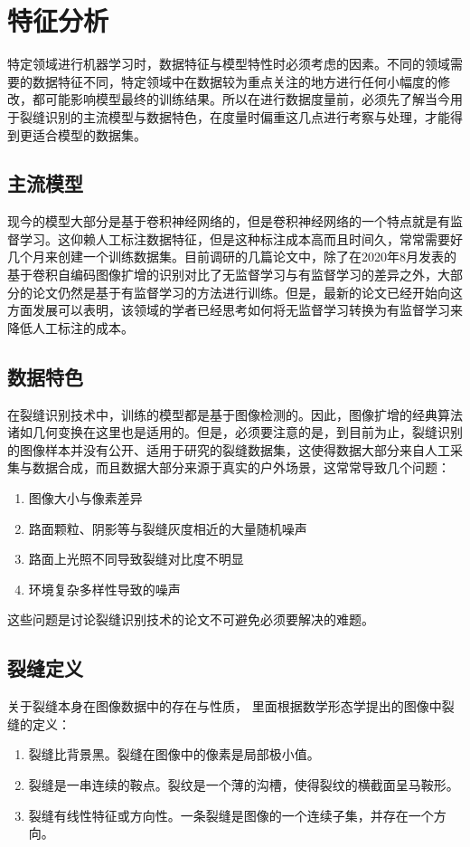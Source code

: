 \documentclass[a4paper,UTF8]{article}
\theoremstyle{definition}
\begin{document}
	\section{特征分析}
	特定领域进行机器学习时，数据特征与模型特性时必须考虑的因素。不同的领域需要的数据特征不同，特定领域中在数据较为重点关注的地方进行任何小幅度的修改，都可能影响模型最终的训练结果。所以在进行数据度量前，必须先了解当今用于裂缝识别的主流模型与数据特色，在度量时偏重这几点进行考察与处理，才能得到更适合模型的数据集。
	\subsection{主流模型}
	现今的模型大部分是基于卷积神经网络的，但是卷积神经网络的一个特点就是有监督学习。这仰赖人工标注数据特征，但是这种标注成本高而且时间久，常常需要好几个月来创建一个训练数据集。目前调研的几篇论文中，除了在2020年8月发表的基于卷积自编码图像扩增的识别\cite{1}对比了无监督学习与有监督学习的差异之外，大部分的论文仍然是基于有监督学习的方法进行训练。但是，最新的论文已经开始向这方面发展可以表明，该领域的学者已经思考如何将无监督学习转换为有监督学习来降低人工标注的成本。
	\subsection{数据特色}
	在裂缝识别技术中，训练的模型都是基于图像检测的。因此，图像扩增的经典算法诸如几何变换在这里也是适用的。但是，必须要注意的是，到目前为止，裂缝识别的图像样本并没有公开、适用于研究的裂缝数据集，这使得数据大部分来自人工采集与数据合成，而且数据大部分来源于真实的户外场景，这常常导致几个问题：
	\begin{enumerate}[(1)]
		\item 图像大小与像素差异
		\item 路面颗粒、阴影等与裂缝灰度相近的大量随机噪声
		\item 路面上光照不同导致裂缝对比度不明显
		\item 环境复杂多样性导致的噪声
	\end{enumerate}
    这些问题是讨论裂缝识别技术的论文不可避免必须要解决的难题。
    
    \subsection{裂缝定义}
    关于裂缝本身在图像数据中的存在与性质，\cite{12} 里面根据数学形态学提出的图像中裂缝的定义：
    \begin{enumerate}[定义1]
    	\item 裂缝比背景黑。裂缝在图像中的像素是局部极小值。
    	\item 裂缝是一串连续的鞍点。裂纹是一个薄的沟槽，使得裂纹的横截面呈马鞍形。
    	\item 裂缝有线性特征或方向性。一条裂缝是图像的一个连续子集，并存在一个方向。
    \end{enumerate}
\end{document}
